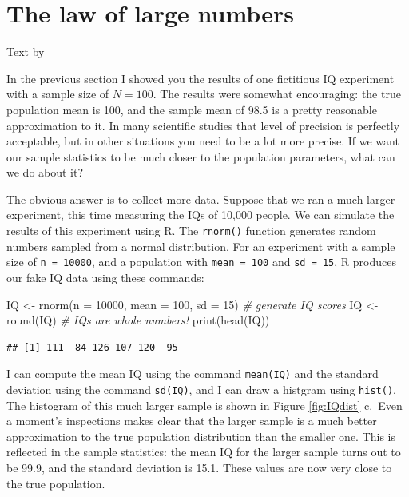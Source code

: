 \documentclass[
]{book}
\newenvironment{Shaded}{\begin{snugshade}}{\end{snugshade}}
\newcommand{\AttributeTok}[1]{\textcolor[rgb]{0.77,0.63,0.00}{#1}}
\newcommand{\CommentTok}[1]{\textcolor[rgb]{0.56,0.35,0.01}{\textit{#1}}}
\newcommand{\DecValTok}[1]{\textcolor[rgb]{0.00,0.00,0.81}{#1}}
\newcommand{\FunctionTok}[1]{\textcolor[rgb]{0.00,0.00,0.00}{#1}}
\newcommand{\NormalTok}[1]{#1}
\newcommand{\OtherTok}[1]{\textcolor[rgb]{0.56,0.35,0.01}{#1}}
\begin{document}
\hypertarget{lawlargenumbers}{%
\section{The law of large numbers}\label{lawlargenumbers}}

Text by \citet{Navarro2018}

In the previous section I showed you the results of one fictitious IQ experiment with a sample size of \(N=100\). The results were somewhat encouraging: the true population mean is 100, and the sample mean of 98.5 is a pretty reasonable approximation to it. In many scientific studies that level of precision is perfectly acceptable, but in other situations you need to be a lot more precise. If we want our sample statistics to be much closer to the population parameters, what can we do about it?

The obvious answer is to collect more data. Suppose that we ran a much larger experiment, this time measuring the IQs of 10,000 people. We can simulate the results of this experiment using R. The \texttt{rnorm()} function generates random numbers sampled from a normal distribution. For an experiment with a sample size of \texttt{n\ =\ 10000}, and a population with \texttt{mean\ =\ 100} and \texttt{sd\ =\ 15}, R produces our fake IQ data using these commands:

\begin{Shaded}
\begin{Highlighting}[]
\NormalTok{IQ }\OtherTok{\textless{}{-}} \FunctionTok{rnorm}\NormalTok{(}\AttributeTok{n =} \DecValTok{10000}\NormalTok{, }\AttributeTok{mean =} \DecValTok{100}\NormalTok{, }\AttributeTok{sd =} \DecValTok{15}\NormalTok{) }\CommentTok{\# generate IQ scores}
\NormalTok{IQ }\OtherTok{\textless{}{-}} \FunctionTok{round}\NormalTok{(IQ) }\CommentTok{\# IQs are whole numbers!}
\FunctionTok{print}\NormalTok{(}\FunctionTok{head}\NormalTok{(IQ))}
\end{Highlighting}
\end{Shaded}

\begin{verbatim}
## [1] 111  84 126 107 120  95
\end{verbatim}

I can compute the mean IQ using the command \texttt{mean(IQ)} and the standard deviation using the command \texttt{sd(IQ)}, and I can draw a histgram using \texttt{hist()}. The histogram of this much larger sample is shown in Figure \ref{fig:IQdist} c.~Even a moment's inspections makes clear that the larger sample is a much better approximation to the true population distribution than the smaller one. This is reflected in the sample statistics: the mean IQ for the larger sample turns out to be 99.9, and the standard deviation is 15.1. These values are now very close to the true population.
\end{document}
